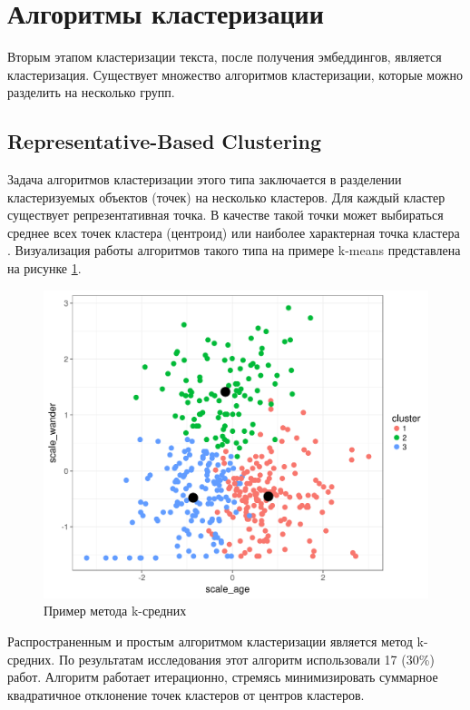 \section{Алгоритмы кластеризации}

Вторым этапом кластеризации текста, после получения эмбеддингов, является кластеризация. Существует множество алгоритмов кластеризации, которые можно разделить на несколько групп.

\subsection{Representative-Based Clustering}

Задача алгоритмов кластеризации этого типа заключается в разделении кластеризуемых объектов (точек) на несколько кластеров. Для каждый кластер существует репрезентативная точка. В качестве такой точки может выбираться среднее всех точек кластера (центроид) или наиболее характерная точка кластера \cite{no-patterns, deep-clustering-survey}. Визуализация работы алгоритмов такого типа на примере k-means представлена на рисунке \ref{img:k-means-example}.

\begin{figure}[h]
    \centering
    \includegraphics[width=\linewidth * \real{0.75}]{images/k-means-example.png}
    \caption{Пример метода k-средних}
    \label{img:k-means-example}
\end{figure}

Распространенным и простым алгоритмом кластеризации является метод k-средних. По результатам исследования \cite{no-patterns} этот алгоритм использовали 17 (30\%) работ.  Алгоритм работает итерационно, стремясь минимизировать суммарное квадратичное отклонение точек кластеров от центров кластеров.

